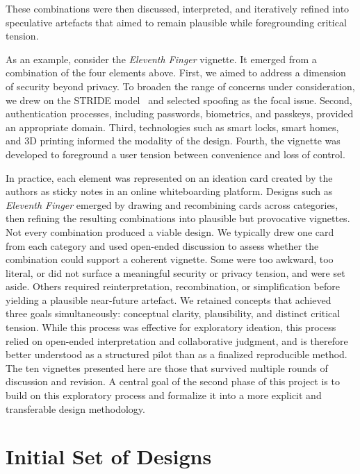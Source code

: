 These combinations were then discussed, interpreted, and iteratively refined into speculative artefacts that aimed to remain plausible while foregrounding critical tension. %

As an example, consider the \textit{Eleventh Finger} vignette. It emerged from a combination of the four elements above. First, we aimed to address a dimension of security beyond privacy. To broaden the range of concerns under consideration, we drew on the STRIDE model~\cite{shostack2014threat} and selected spoofing as the focal issue. Second, authentication processes, including passwords, biometrics, and passkeys, provided an appropriate domain. Third, technologies such as smart locks, smart homes, and 3D printing informed the modality of the design. Fourth, the vignette was developed to foreground a user tension between convenience and loss of control.

In practice, each element was represented on an ideation card created by the authors as sticky notes in an online whiteboarding platform. Designs such as \textit{Eleventh Finger} emerged by drawing and recombining cards across categories, then refining the resulting combinations into plausible but provocative vignettes. Not every combination produced a viable design. We typically drew one card from each category and used open-ended discussion to assess whether the combination could support a coherent vignette. Some were too awkward, too literal, or did not surface a meaningful security or privacy tension, and were set aside. Others required reinterpretation, recombination, or simplification before yielding a plausible near-future artefact. We retained concepts that achieved three goals simultaneously: conceptual clarity, plausibility, and distinct critical tension. While this process was effective for exploratory ideation, this process relied on open-ended interpretation and collaborative judgment, and is therefore better understood as a structured pilot than as a finalized reproducible method. The ten vignettes presented here are those that survived multiple rounds of discussion and revision. A central goal of the second phase of this project is to build on this exploratory process and formalize it into a more explicit and transferable design methodology.



\section{Initial Set of Designs}
\label{sec:meth1}

